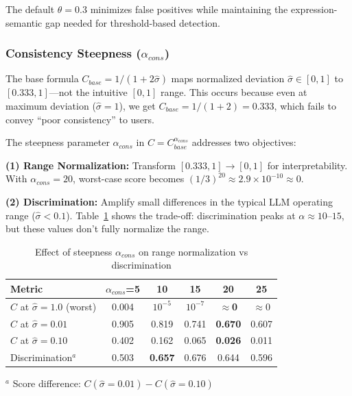 \documentclass{article}
\begin{document}
The default $\theta=0.3$ minimizes false positives while maintaining the expression-semantic gap needed for threshold-based detection.

\subsubsection{Consistency Steepness ($\alpha_{cons}$)}
The base formula $C_{base} = 1/(1 + 2\hat{\sigma})$ maps normalized deviation $\hat{\sigma} \in [0,1]$ to $[0.333, 1]$---not the intuitive $[0,1]$ range. This occurs because even at maximum deviation ($\hat{\sigma}=1$), we get $C_{base} = 1/(1+2) = 0.333$, which fails to convey ``poor consistency'' to users.

The steepness parameter $\alpha_{cons}$ in $C = C_{base}^{\alpha_{cons}}$ addresses two objectives:

\textbf{(1) Range Normalization:} Transform $[0.333, 1] \rightarrow [0, 1]$ for interpretability. With $\alpha_{cons}=20$, worst-case score becomes $(1/3)^{20} \approx 2.9 \times 10^{-10} \approx 0$.

\textbf{(2) Discrimination:} Amplify small differences in the typical LLM operating range ($\hat{\sigma} < 0.1$). Table~\ref{tab:ablation-steepness} shows the trade-off: discrimination peaks at $\alpha \approx 10$--$15$, but these values don't fully normalize the range.

\begin{table}[h]
\vspace{-2mm}
\centering
\caption{Effect of steepness $\alpha_{cons}$ on range normalization vs discrimination}
\label{tab:ablation-steepness}
\small
\begin{tabular}{lccccc}
\toprule
\textbf{Metric} & $\alpha_{cons}$=5 & 10 & 15 & \textbf{20} & 25 \\
\midrule
$C$ at $\hat{\sigma}=1.0$ (worst) & 0.004 & $10^{-5}$ & $10^{-7}$ & \textbf{$\approx$0} & $\approx$0 \\
$C$ at $\hat{\sigma}=0.01$ & 0.905 & 0.819 & 0.741 & \textbf{0.670} & 0.607 \\
$C$ at $\hat{\sigma}=0.10$ & 0.402 & 0.162 & 0.065 & \textbf{0.026} & 0.011 \\
Discrimination$^a$ & 0.503 & \textbf{0.657} & 0.676 & 0.644 & 0.596 \\
\bottomrule
\end{tabular}
\vspace{0.3em}
\small{$^a$ Score difference: $C(\hat{\sigma}=0.01) - C(\hat{\sigma}=0.10)$}
\vspace{-2mm}
\end{table}
\end{document}
